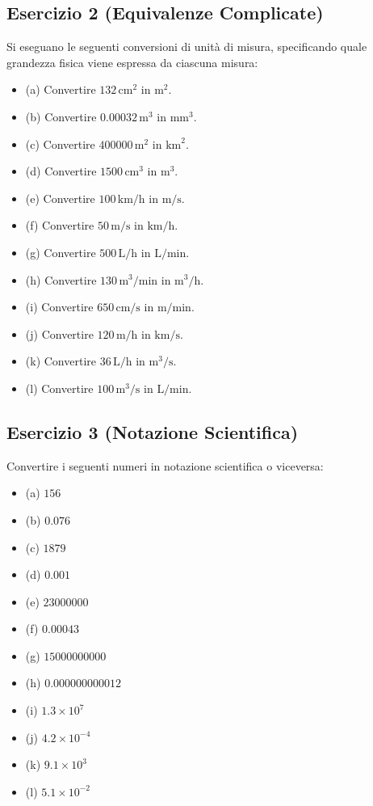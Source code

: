 \documentclass[a4paper,12pt]{article}
\begin{document}
\subsection*{Esercizio 2 (Equivalenze Complicate)}
Si eseguano le seguenti conversioni di unità di misura, specificando quale grandezza fisica viene espressa da ciascuna misura:
\begin{itemize}
    \item (a) Convertire \(132 \, \text{cm}^2\) in \(\text{m}^2\).
    \item (b) Convertire \(0.00032 \, \text{m}^3\) in \(\text{mm}^3\).
    \item (c) Convertire \(400000 \, \text{m}^2\) in \(\text{km}^2\).
    \item (d) Convertire \(1500 \, \text{cm}^3\) in \(\text{m}^3\).
    \item (e) Convertire \(100 \, \text{km/h}\) in \(\text{m/s}\).
    \item (f) Convertire \(50 \, \text{m/s}\) in \(\text{km/h}\).
    \item (g) Convertire \(500 \, \text{L/h}\) in \(\text{L/min}\).
    \item (h) Convertire \(130 \, \text{m}^3/\text{min}\) in \(\text{m}^3/\text{h}\).
    \item (i) Convertire \(650 \, \text{cm/s}\) in \(\text{m/min}\).
    \item (j) Convertire \(120 \, \text{m/h}\) in \(\text{km/s}\).
    \item (k) Convertire \(36 \, \text{L/h}\) in \(\text{m}^3/\text{s}\).
    \item (l) Convertire \(100 \, \text{m}^3/\text{s}\) in \(\text{L/min}\).
\end{itemize}

\subsection*{Esercizio 3 (Notazione Scientifica)}
Convertire i seguenti numeri in notazione scientifica o viceversa:
\begin{itemize}
    \item (a) \(156\)
    \item (b) \(0.076\)
    \item (c) \(1879\)
    \item (d) \(0.001\)
    \item (e) \(23000000\)
    \item (f) \(0.00043\)
    \item (g) \(15000000000\)
    \item (h) \(0.000000000012\)
    \item (i) \(1.3 \times 10^7\)
    \item (j) \(4.2 \times 10^{-4}\)
    \item (k) \(9.1 \times 10^3\)
    \item (l) \(5.1 \times 10^{-2}\)
\end{itemize}
\end{document}
